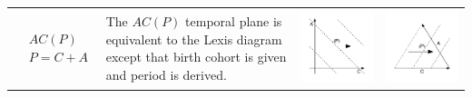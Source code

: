 \documentclass[12pt,oneside,letter]{article} %
\begin{document}
\begin{center}
\begin{longtable}{m{}m{}m{}m{}}
  \midrule
  $$\begin{aligned}
    &AC(P) \\
    &P = C + A
  \end{aligned}$$ &
  The $AC(P)$ temporal plane is equivalent to the Lexis diagram except that
  birth cohort is given and period is derived. &
  \includegraphics[width = \linewidth]{Figures/JonasTable/ACp.pdf} & \includegraphics[width = \linewidth]{Figures/JonasTable/ACp_iso.pdf}  \\

\end{longtable}
\end{center}
\end{document}
